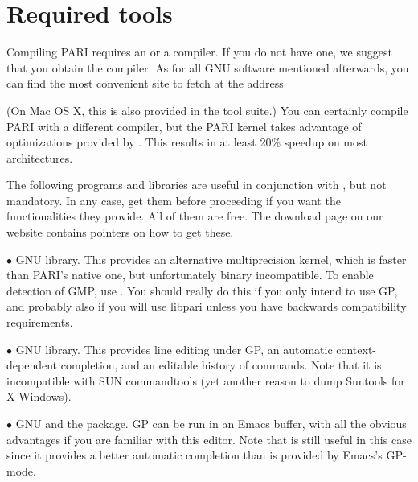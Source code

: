 %
%

\def\tocwrite#1{}
\section{Required tools}

Compiling PARI requires an  or a  compiler. If you do
not have one, we suggest that you obtain the  compiler. As for
all GNU software mentioned afterwards, you can find the most convenient site
to fetch  at the address


\noindent (On Mac OS X, this is also provided in the  tool
suite.) You can certainly compile PARI with a different compiler, but
the PARI kernel takes advantage of optimizations provided by .
This results in at least 20\% speedup on most architectures.

 The following programs and libraries are useful
in conjunction with , but not mandatory. In any case, get them before
proceeding if you want the functionalities they provide. All of them are free.
The download page on our website
 contains pointers on how
to get these.

  $\bullet$ GNU  library. This provides an alternative multiprecision
kernel, which is faster than PARI's native one, but unfortunately binary
incompatible. To enable detection of GMP, use .
You should really do this if you only intend to use GP, and probably also if
you will use libpari unless you have backwards compatibility requirements.

  $\bullet$ GNU  library. This provides line editing under GP,
an automatic context-dependent completion, and an editable history of
commands. Note that it is incompatible with SUN commandtools (yet another
reason to dump Suntools for X Windows).

  $\bullet$ GNU  and the  package. GP can be run in
an Emacs buffer, with all the obvious advantages if you are familiar with
this editor. Note that  is still useful in this case since it
provides a better automatic completion than is provided by Emacs's GP-mode.

